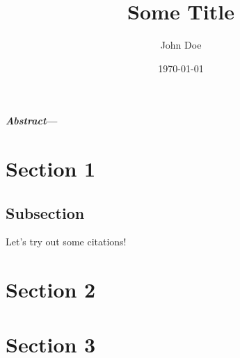 \documentclass[letterpaper, 10pt, twocolumn]{article}
\title{\Huge{\textbf{Some Title}}}
\author{John Doe}
\date{\today}
\begin{document}
\maketitle

\textbf{\textit{Abstract}—\blindtext[1]}

\section{Section 1}
\blindtext[1]
\subsection{Subsection}
Let's try out some citations! \cite{einstein,latexcompanion,knuthwebsite}

\section{Section 2}
\blindtext[1]

\section{Section 3}
\blindtext[1]

\printbibliography

\tableofcontents
\end{document}
